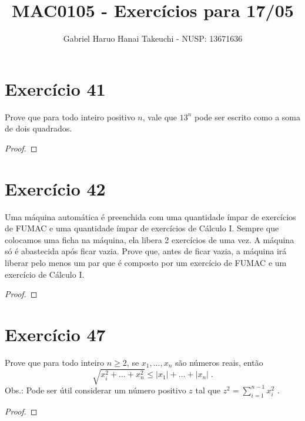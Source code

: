 \documentclass{article}
\author{Gabriel Haruo Hanai Takeuchi - NUSP: 13671636}
\title{MAC0105 - Exercícios para 17/05}
\date{}
\begin{document}
\maketitle

\section*{Exercício 41}
Prove que para todo inteiro positivo $n$, vale que $13^n$ pode ser escrito como a soma de dois quadrados.

\begin{proof}
 
\end{proof}

\section*{Exercício 42}
Uma máquina automática é preenchida com uma quantidade ímpar de exercícios de FUMAC
e uma quantidade ímpar de exercícios de Cálculo I. Sempre que colocamos uma ficha na
máquina, ela libera 2 exercícios de uma vez. A máquina só é abastecida após ficar vazia.
Prove que, antes de ficar vazia, a máquina irá liberar pelo menos um par que é composto por
um exercício de FUMAC e um exercício de Cálculo I.

\begin{proof}
    
\end{proof}

\section*{Exercício 47}
Prove que para todo inteiro $n \geq 2$, se $x_1,\dots, x_n$ são números reais, então
\[
\sqrt{x_i^2 + \dots + x_n^2} \leq |x_1| + \dots + |x_n| \; .
\]
Obs.: Pode ser útil considerar um número positivo $z$ tal que $z^2 = \sum_{i=1}^{n-1} x_i^2$ .

\begin{proof}
    
\end{proof}
\end{document}

